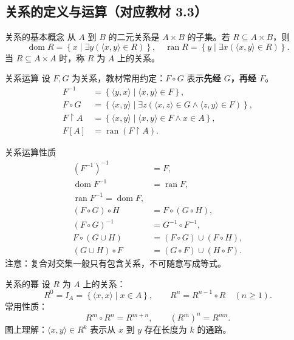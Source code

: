 \documentclass[UTF8,zihao=-4]{ctexart}
\newcommand{\kw}[1]{\textbf{\color{main}#1}}
\newcommand{\set}[1]{\left\{#1\right\}}
\newcommand{\dom}{\operatorname{dom}}
\newcommand{\ran}{\operatorname{ran}}
\begin{document}
\subsection{关系的定义与运算（对应教材 3.3）}

\begin{corebox}{关系的基本概念}
从 $A$ 到 $B$ 的二元关系是 $A\times B$ 的子集。若 $R\subseteq A\times B$，则
\[
\dom R=\set{x\mid \exists y(\langle x,y\rangle\in R)},\quad
\ran R=\set{y\mid \exists x(\langle x,y\rangle\in R)}.
\]
当 $R\subseteq A\times A$ 时，称 $R$ 为 $A$ 上的关系。
\end{corebox}

\begin{corebox}{关系运算}
设 $F,G$ 为关系，教材常用约定：$F\circ G$ 表示\kw{先经 $G$，再经 $F$}。
\begin{align*}
F^{-1}&=\set{\langle y,x\rangle\mid \langle x,y\rangle\in F},\\
F\circ G&=\set{\langle x,y\rangle\mid \exists z(\langle x,z\rangle\in G\land\langle z,y\rangle\in F)},\\
F\upharpoonright A&=\set{\langle x,y\rangle\mid \langle x,y\rangle\in F\land x\in A},\\
F[A]&=\ran(F\upharpoonright A).
\end{align*}
\end{corebox}

\begin{corebox}{关系运算性质}
\begin{align*}
(F^{-1})^{-1}&=F,\\
\dom F^{-1}&=\ran F,\\ \ran F^{-1}=\dom F,\\
(F\circ G)\circ H&=F\circ(G\circ H),\\
(F\circ G)^{-1}&=G^{-1}\circ F^{-1},\\
F\circ(G\cup H)&=(F\circ G)\cup(F\circ H),\\
(G\cup H)\circ F&=(G\circ F)\cup(H\circ F).
\end{align*}
注意：复合对交集一般只有包含关系，不可随意写成等式。
\end{corebox}

\begin{corebox}{关系的幂}
设 $R$ 为 $A$ 上的关系：
\[
R^0=I_A=\set{\langle x,x\rangle\mid x\in A},\qquad R^n=R^{n-1}\circ R\quad(n\ge1).
\]
常用性质：
\[
R^m\circ R^n=R^{m+n},\qquad (R^m)^n=R^{mn}.
\]
图上理解：$\langle x,y\rangle\in R^k$ 表示从 $x$ 到 $y$ 存在长度为 $k$ 的通路。
\end{corebox}
\end{document}
